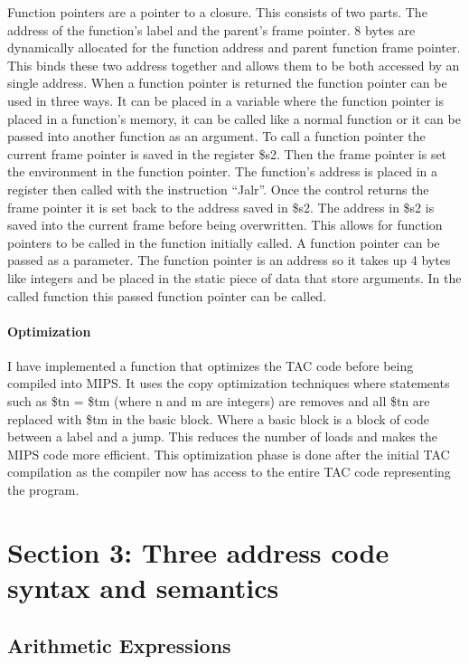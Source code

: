 \documentclass{article}
\begin{document}
	Function pointers are a pointer to a closure. This consists of two parts. The address of the function's label and the parent's frame pointer. 8 bytes are dynamically allocated for the function address and parent function frame pointer.  This binds these two address together and allows them to be both accessed by an single address. When a function pointer is returned the function pointer can be used in three ways. It can be placed in a variable where the function pointer is placed in a function's memory, it can be called like a normal function or it can be passed into another function as an argument. To call a function pointer the current frame pointer is saved in the register \$s2. Then the frame pointer is set the environment in the function pointer. The function's address is placed in a register then called with the instruction “Jalr”. Once the control returns the frame pointer it is set back to the address saved in \$s2. The address in \$s2 is saved into the current frame before being overwritten. This allows for function pointers to be called in the function initially called. A function pointer can be passed as a parameter. The function pointer is an address so it takes up 4 bytes like integers and be placed in the static piece of data that store arguments. In the called function this passed function pointer can be called.
	
	\paragraph{Optimization}
	
	I have implemented a function that optimizes the TAC code before being compiled into MIPS. It uses the copy optimization techniques where statements such as \$tn = \$tm (where n and m are integers) are removes and all \$tn are replaced with \$tm in the basic block. Where a basic block is a block of code between a label and a jump. This reduces the number of loads and makes the MIPS code more efficient. This optimization phase is done after the initial TAC compilation as the compiler now has access to the entire TAC code representing the program.
	
	
	\section{Section 3: Three address code syntax and semantics}
	
	\subsection{Arithmetic Expressions}
	
\end{document}

